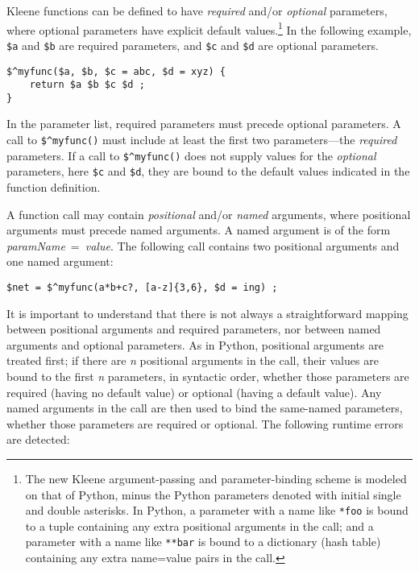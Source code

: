 Kleene functions can be defined to have \emph{required} and/or \emph{optional}
parameters, where optional parameters have explicit default
values.\cprotect\footnote{The new Kleene argument-passing and parameter-binding scheme
is modeled on that of Python, minus the Python parameters denoted with
initial single and double asterisks.  In Python, a parameter with a name like
\verb!*foo! is bound to a tuple containing any extra positional arguments in
the call; and
a parameter with a name like \verb!**bar! is bound to a dictionary (hash table) containing any
extra name=value pairs in the call.} In
the following example, \verb!$a! and \verb!$b! are required parameters, and \verb!$c! and
\verb!$d! are optional parameters.

\begin{Verbatim}
$^myfunc($a, $b, $c = abc, $d = xyz) {
	return $a $b $c $d ;
}
\end{Verbatim}

\noindent
In the parameter list, required parameters must precede optional parameters.
A call to \verb!$^myfunc()! must include at least the first two parameters---the \emph{required} parameters.
If a call to \verb!$^myfunc()! does not supply values for the \emph{optional}
parameters, here \verb!$c! and \verb!$d!, they are bound to the default values indicated
in the function definition.

A function call may contain \emph{positional} and/or \emph{named}
arguments, where positional arguments must precede named arguments.  A
named argument is of the form \emph{paramName}~=~\emph{value}.
The following call contains two positional arguments and one named
argument:

\begin{Verbatim}
$net = $^myfunc(a*b+c?, [a-z]{3,6}, $d = ing) ;
\end{Verbatim}

\noindent
It is important to understand that there is not always a straightforward mapping
between positional arguments and required parameters, nor between named
arguments and optional parameters.  As in Python, positional arguments
are treated first; if there are \emph{n} positional arguments in the
call, their
values are bound to the first \emph{n} parameters, in syntactic order,
whether those
parameters are required (having no default value) or optional (having a
default value).  Any named arguments in the call are then used
to bind the same-named parameters, whether those parameters are
required or optional.  The following runtime errors are detected:

